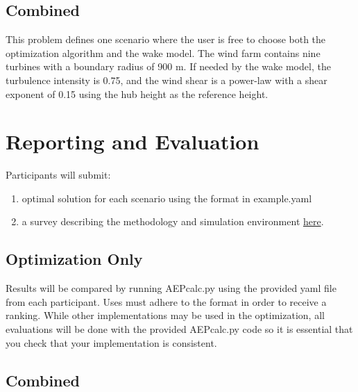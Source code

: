 \documentclass{article}
\begin{document}
\subsection{Combined}

This problem defines one scenario where the user is free to choose both the optimization algorithm and the wake model.  The wind farm contains nine turbines with a boundary radius of 900 m.  If needed by the wake model, the turbulence intensity is 0.75, and the wind shear is a power-law with a shear exponent of 0.15 using the hub height as the reference height.

\section{Reporting and Evaluation}

Participants will submit:
\begin{enumerate}
    \item optimal solution for each scenario using the format in example.yaml 
    \item a survey describing the methodology and simulation environment \url{here}.
\end{enumerate}

\subsection{Optimization Only}

Results will be compared by running AEPcalc.py using the provided yaml file from each participant.  Uses must adhere to the format in order to receive a ranking.  While other implementations may be used in the optimization, all evaluations will be done with the provided AEPcalc.py code so it is essential that you check that your implementation is consistent.

\subsection{Combined}
\end{document}

